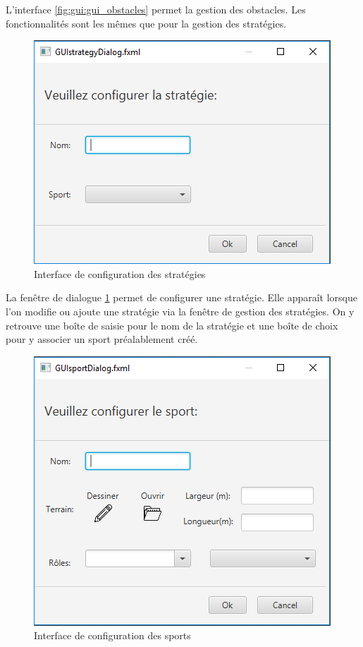 L'interface \ref{fig:gui:gui_obstacles} permet la gestion des obstacles.
Les fonctionnalités sont les mêmes que pour la gestion des stratégies.

\newpage

\begin{figure}[htpb]
    \centering
    \includegraphics[scale=0.6]{fig/gui/gui_strategie_dialog.png}
    \caption{Interface de configuration des stratégies}
    \label{fig:gui:gui_strategie_dialog}
\end{figure}

La fenêtre de dialogue \ref{fig:gui:gui_strategie_dialog} permet de configurer une stratégie.
Elle apparaît lorsque l'on modifie ou ajoute une stratégie via la fenêtre de gestion des stratégies.
On y retrouve une boîte de saisie pour le nom de la stratégie et une boîte de choix pour y associer un sport préalablement créé.

\begin{figure}[htpb]
    \centering
    \includegraphics[scale=0.6]{fig/gui/gui_sport_dialog.png}
    \caption{Interface de configuration des sports}
    \label{fig:gui:gui_sport_dialog}
\end{figure}

